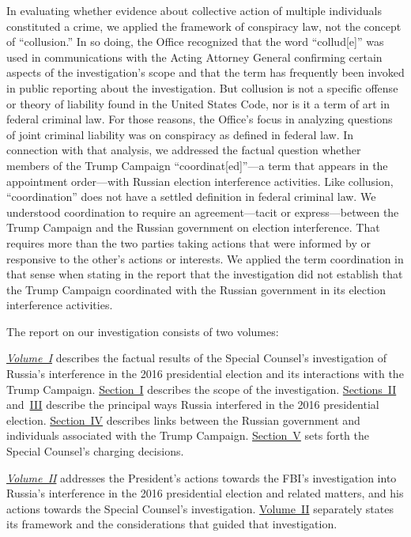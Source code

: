 In evaluating whether evidence about collective action of multiple individuals constituted a crime, we applied the framework of conspiracy law, not the concept of ``collusion.''
In so doing, the Office recognized that the word ``collud[e]'' was used in communications with the Acting Attorney General confirming certain aspects of the investigation's scope and that the term has frequently been invoked in public reporting about the investigation.
But collusion is not a specific offense or theory of liability found in the United States Code, nor is it a term of art in federal criminal law.
For those reasons, the Office's focus in analyzing questions of joint criminal liability was on conspiracy as defined in federal law.
In connection with that analysis, we addressed the factual question whether members of the Trump Campaign ``coordinat[ed]''---a term that appears in the appointment order---with Russian election interference activities.
Like collusion, ``coordination'' does not have a settled definition in federal criminal law.
We understood coordination to require an agreement---tacit or express---between the Trump Campaign and the Russian government on election interference.
That requires more than the two parties taking actions that were informed by or responsive to the other's actions or interests.
We applied the term coordination in that sense when stating in the report that the investigation did not establish that the Trump Campaign coordinated with the Russian government in its election interference activities.

\hr

The report on our investigation consists of two volumes:

\hyperref[chap:volume-1]{\textit{Volume~I}} describes the factual results of the Special Counsel's investigation of Russia's interference in the 2016 presidential election and its interactions with the Trump Campaign.
\hyperlink{section.1.1}{Section~I} describes the scope of the investigation.
\hyperlink{section.1.2}{Sections~II} and~\hyperlink{section.1.3}{III} describe the principal ways Russia interfered in the 2016 presidential election.
\hyperlink{section.1.4}{Section~IV} describes links between the Russian government and individuals associated with the Trump Campaign.
\hyperlink{section.1.5}{Section~V} sets forth the Special Counsel's charging decisions.

\hyperref[chap:volume-2]{\textit{Volume~II}} addresses the President's actions towards the FBI's investigation into Russia's interference in the 2016 presidential election and related matters, and his actions towards the Special Counsel's investigation.
\hyperref[chap:volume-2]{Volume~II} separately states its framework and the considerations that guided that investigation.

